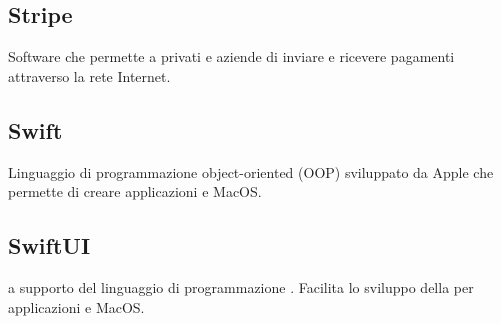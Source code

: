 \subsection*{Stripe}
Software che permette a privati e aziende di inviare e ricevere pagamenti attraverso la rete Internet.

\subsection*{Swift}
Linguaggio di programmazione object-oriented (OOP) sviluppato da Apple che permette di creare applicazioni  e MacOS.  

\subsection*{SwiftUI}
 a supporto del linguaggio di programmazione . Facilita lo sviluppo della  per applicazioni  e MacOS.